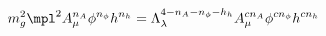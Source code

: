 \begin{equation}
m_g^2 \mpl^2 A_{\mu}^{n_A} \phi^{n_{\phi}} h^{n_h} 
= \Lambda_\lambda^{4 - n_A - n_{\phi} 
- h_h} A^{c n_A}_{\mu} \phi^{c n_{\phi}} h^{c
n_h}
\end{equation} 
